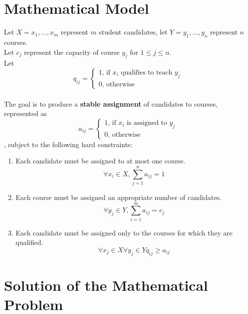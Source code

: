 \documentclass[twoside,twocolumn]{article}
\begin{document}
    \section{Mathematical Model}
    Let $X = {x_1,...,x_m}$ represent $m$ student candidates, let $Y = {y_1,...,y_n}$ represent $n$ courses. \\
    Let $c_j$ represent the capacity of course $y_j$ for $1 \leq j \leq n$. \\
    Let $$q_{ij} = \begin{cases}1\text{, if $x_i$ qualifies to teach $y_j$} \\ 0\text{, otherwise} \end{cases}$$ \\
    The goal is to produce a \textbf{stable assignment} of candidates to courses, represented as 
    $$a_{ij} = \begin{cases}1\text{, if $x_i$ is assigned to $y_j$} \\ 0\text{, otherwise} \end{cases}$$, 
    subject to the following hard constraints:
    \begin{enumerate}
        \item Each candidate must be assigned to at most one course. $$\forall x_i \in X, \sum_{j = 1}^n a_{ij} = 1$$ 
        \item Each course must be assigned an appropriate number of candidates. $$\forall y_j \in Y, \sum_{i = 1}^m a_{ij} = c_j$$
        \item Each candidate must be assigned only to the courses for which they are qualified. $$\forall x_j \in X \forall y_j \in Y q_{ij} \geq a_{ij}$$
    \end{enumerate}
    \section{Solution of the Mathematical Problem}
\end{document}
